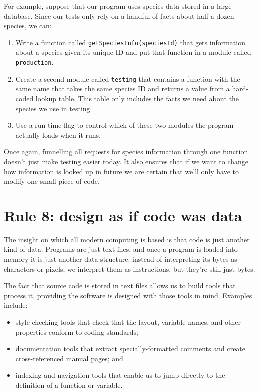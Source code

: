 \documentclass[10pt,letterpaper]{article}
\begin{document}
For example,
suppose that our program uses species data stored in a large database.
Since our tests only rely on a handful of facts about half a dozen species,
we can:

\begin{enumerate}
\item
  Write a function called \texttt{getSpeciesInfo(speciesId)}
  that gets information about a species given its unique ID
  and put that function in a module called \texttt{production}.
\item
  Create a second module called \texttt{testing}
  that contains a function with the same name
  that takes the same species ID
  and returns a value from a hard-coded lookup table.
  This table only includes the facts we need about the species we use in testing.
\item
  Use a run-time flag to control which of these two modules the program actually loads
  when it runs.
\end{enumerate}

Once again,
funnelling all requests for species information through one function
doesn't just make testing easier today.
It also ensures that if we want to change how information is looked up in future
we are certain that we'll only have to modify one small piece of code.

\section*{Rule 8: design as if code was data}

The insight on which all modern computing is based is that
code is just another kind of data.
Programs are just text files,
and once a program is loaded into memory it is just another data structure:
instead of interpreting its bytes as characters or pixels,
we interpret them as instructions,
but they're still just bytes.

The fact that source code is stored in text files
allows us to build tools that process it,
providing the software is designed with those tools in mind.
Examples include:

\begin{itemize}
\item
  style-checking tools that check that the layout, variable names, and other properties
  conform to coding standards;
\item
  documentation tools that extract specially-formatted comments
  and create cross-referenced manual pages; and
\item
  indexing and navigation tools that enable us to jump directly to
  the definition of a function or variable.
\end{itemize}
\end{document}
